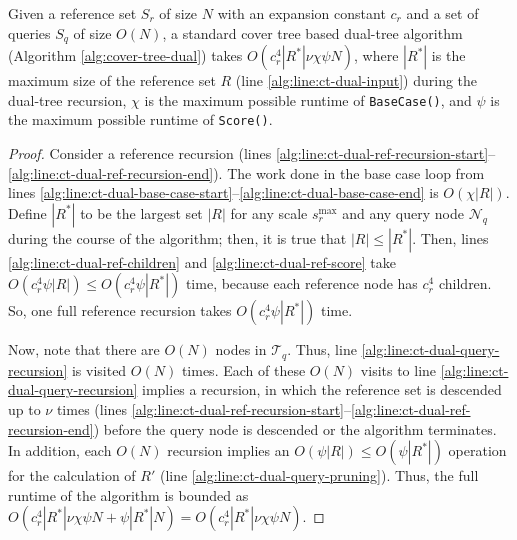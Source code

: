 \begin{thm}
\label{thm:ct-runtime}
Given a reference set $S_r$ of size $N$ with an expansion constant $c_r$ and a
set of queries $S_q$ of size $O(N)$, a standard cover tree based dual-tree
algorithm (Algorithm \ref{alg:cover-tree-dual}) takes $O(c_r^4 | R^* | \nu \chi
\psi N)$, where $ | R^* | $ is the maximum size of the reference set $R$ (line
\ref{alg:line:ct-dual-input}) during the dual-tree recursion, $\chi$ is
the maximum possible runtime of \texttt{BaseCase()}, and $\psi$ is the maximum
possible runtime of \texttt{Score()}.
\end{thm}

\begin{proof}
Consider a reference recursion (lines
\ref{alg:line:ct-dual-ref-recursion-start}--\ref{alg:line:ct-dual-ref-recursion-end}).
The work done in the base case loop from lines
\ref{alg:line:ct-dual-base-case-start}--\ref{alg:line:ct-dual-base-case-end} is
$O(\chi | R |)$.  Define $| R^* |$ to be the largest set $|R|$ for any scale
$s_r^{\max}$ and any query node $\mathscr{N}_q$ during the course of the
algorithm; then, it is true that $| R | \le | R^* |$.
%
Then, lines \ref{alg:line:ct-dual-ref-children} and
\ref{alg:line:ct-dual-ref-score} take $O(c_r^4 \psi | R |) \le O(c_r^4 \psi |
R^* |)$ time, because each reference node has $c_r^4$ children.  So, one
full reference recursion takes $O(c_r^4 \psi | R^* |)$ time.

Now, note that there are $O(N)$ nodes in $\mathscr{T}_q$.  Thus, line
\ref{alg:line:ct-dual-query-recursion} is visited $O(N)$ times.  Each of these
$O(N)$ visits to line \ref{alg:line:ct-dual-query-recursion} implies a
recursion, in which the reference set is descended up to $\nu$ times (lines
\ref{alg:line:ct-dual-ref-recursion-start}--\ref{alg:line:ct-dual-ref-recursion-end})
before the query node is descended or the algorithm terminates.  In addition,
each $O(N)$ recursion implies an $O(\psi |R|) \le O(\psi |R^*|)$ operation for
the calculation of $R'$ (line \ref{alg:line:ct-dual-query-pruning}).  Thus, the
full runtime of the algorithm is bounded as $O(c_r^4 |R^*| \nu \chi \psi N +
\psi |R^*| N) = O(c_r^4 |R^*| \nu \chi \psi N)$.
\end{proof}

